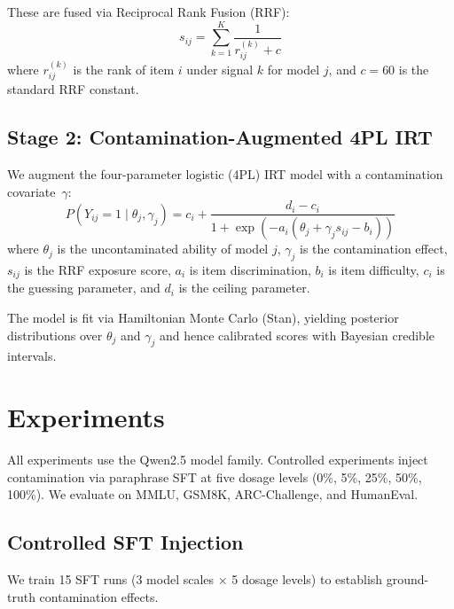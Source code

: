 \documentclass[letterpaper, 10pt, twocolumn]{article}
\begin{document}
These are fused via Reciprocal Rank Fusion (RRF):
\begin{equation}
s_{ij} = \sum_{k=1}^{K} \frac{1}{r_{ij}^{(k)} + c}
\end{equation}
where $r_{ij}^{(k)}$ is the rank of item $i$ under signal $k$ for model $j$, and $c=60$ is the standard RRF constant.

\subsection{Stage 2: Contamination-Augmented 4PL IRT}

We augment the four-parameter logistic (4PL) IRT model with a contamination covariate~$\gamma$:
\begin{equation}
P(Y_{ij} = 1 \mid \theta_j, \gamma_j) = c_i + \frac{d_i - c_i}{1 + \exp(-a_i(\theta_j + \gamma_j s_{ij} - b_i))}
\end{equation}
where $\theta_j$ is the uncontaminated ability of model $j$, $\gamma_j$ is the contamination effect, $s_{ij}$ is the RRF exposure score, $a_i$ is item discrimination, $b_i$ is item difficulty, $c_i$ is the guessing parameter, and $d_i$ is the ceiling parameter.

The model is fit via Hamiltonian Monte Carlo (Stan), yielding posterior distributions over $\theta_j$ and $\gamma_j$ and hence calibrated scores with Bayesian credible intervals.

\section{Experiments}

All experiments use the Qwen2.5 model family.
Controlled experiments inject contamination via paraphrase SFT at five dosage levels (0\%, 5\%, 25\%, 50\%, 100\%).
We evaluate on MMLU, GSM8K, ARC-Challenge, and HumanEval.

\subsection{Controlled SFT Injection}
\label{sec:sft_injection}

We train 15 SFT runs (3 model scales $\times$ 5 dosage levels) to establish ground-truth contamination effects.
\end{document}
